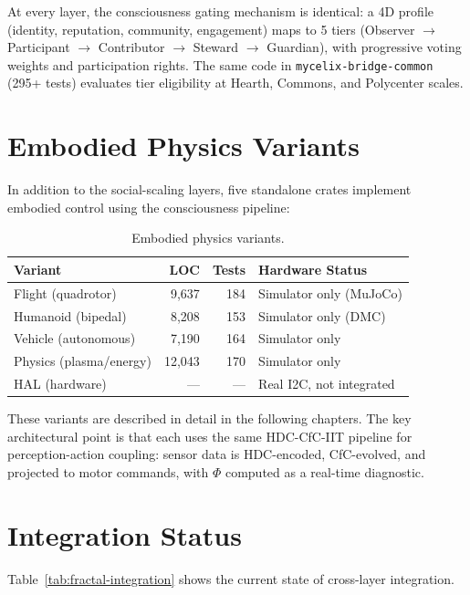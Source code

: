 \documentclass[12pt]{book}
\begin{document}
At every layer, the consciousness gating mechanism is identical: a 4D profile (identity, reputation, community, engagement) maps to 5 tiers (Observer $\to$ Participant $\to$ Contributor $\to$ Steward $\to$ Guardian), with progressive voting weights and participation rights. The same code in \texttt{mycelix-bridge-common} (295+ tests) evaluates tier eligibility at Hearth, Commons, and Polycenter scales.

\section{Embodied Physics Variants}

In addition to the social-scaling layers, five standalone crates implement embodied control using the consciousness pipeline:

\begin{table}[H]
\centering
\caption{Embodied physics variants.}
\label{tab:embodied-variants}
\begin{tabular}{lrrl}
\toprule
\textbf{Variant} & \textbf{LOC} & \textbf{Tests} & \textbf{Hardware Status} \\
\midrule
Flight (quadrotor) & 9,637 & 184 & Simulator only (MuJoCo) \\
Humanoid (bipedal) & 8,208 & 153 & Simulator only (DMC) \\
Vehicle (autonomous) & 7,190 & 164 & Simulator only \\
Physics (plasma/energy) & 12,043 & 170 & Simulator only \\
HAL (hardware) & --- & --- & Real I2C, not integrated \\
\bottomrule
\end{tabular}
\end{table}

These variants are described in detail in the following chapters. The key architectural point is that each uses the same HDC-CfC-IIT pipeline for perception-action coupling: sensor data is HDC-encoded, CfC-evolved, and projected to motor commands, with $\Phi$ computed as a real-time diagnostic.

\section{Integration Status}

Table~\ref{tab:fractal-integration} shows the current state of cross-layer integration.
\end{document}
